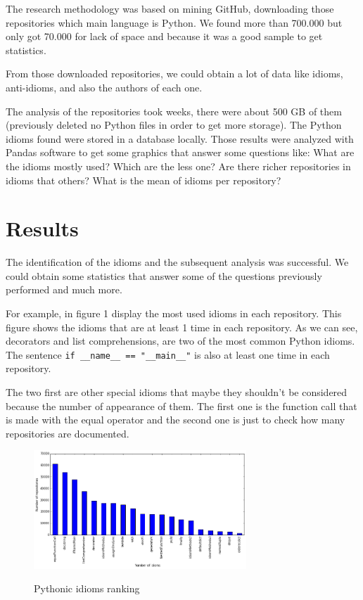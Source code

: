 \documentclass[conference]{IEEEtran}
\begin{document}
The research methodology was based on mining GitHub, downloading those repositories which main language is Python. We found more than 700.000 but only got 70.000 for lack of space and because it was a good sample to get statistics.

From those downloaded repositories, we could obtain a lot of data like idioms, anti-idioms, and also the authors of each one.


The analysis of the repositories took weeks, there were about 500 GB of them (previously deleted no Python files in order to get more storage). The Python idioms found were stored in a database locally. Those results were analyzed with Pandas software to get some graphics that answer some questions like: What are the idioms mostly used? Which are the less one? Are there richer repositories in idioms that others? What is the mean of idioms per repository?

\section{Results}

The identification of the idioms and the subsequent analysis was successful. We could obtain some statistics that answer some of the questions previously performed and much more.

For example, in figure 1 display the most used idioms in each repository. This figure shows the idioms that are at least 1 time in each repository. As we can see, decorators and list comprehensions, are two of the most common Python idioms. The sentence \verb|if __name__ == "__main__"| is also at least one time in each repository.

The two first are other special idioms that maybe they shouldn't be considered because the number of appearance of them. The first one is the function call that is made with the equal operator and the second one is just to check how many repositories are documented.

\begin{figure}[ht]
\centering
\includegraphics[width=80mm]{img/num_idiom_repo.png}
\label{fig:idiom_ranking}
\caption{Pythonic idioms ranking}
\end{figure}
\end{document}
